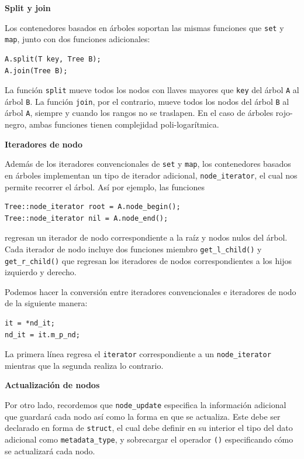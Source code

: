 \documentclass[11pt, letterpaper, twoside]{article}
\begin{document}
\textbf{Split y join}

Los contenedores basados en árboles soportan las mismas funciones que \texttt{set} y \texttt{map}, junto con dos funciones adicionales: 

\begin{lstlisting}
A.split(T key, Tree B);
A.join(Tree B);
\end{lstlisting}

La función \texttt{split} mueve todos los nodos con llaves mayores que \texttt{key} del árbol \texttt{A} al árbol \texttt{B}. La función \texttt{join}, por el contrario, mueve todos los nodos del árbol \texttt{B} al árbol \texttt{A}, siempre y cuando los rangos no se traslapen. En el caso de árboles rojo-negro, ambas funciones tienen complejidad poli-logarítmica.\medskip

\textbf{Iteradores de nodo}

Además de los iteradores convencionales de \texttt{set} y \texttt{map}, los contenedores basados en árboles implementan un tipo de iterador adicional, \texttt{node\_iterator}, el cual nos permite recorrer el árbol. Así por ejemplo, las funciones
\begin{lstlisting}
Tree::node_iterator root = A.node_begin();
Tree::node_iterator nil = A.node_end();
\end{lstlisting}
regresan un iterador de nodo correspondiente a la raíz y nodos nulos del árbol. Cada iterador de nodo incluye dos funciones miembro \texttt{get\_l\_child()} y \texttt{get\_r\_child()} que regresan los iteradores de nodos correspondientes a los hijos izquierdo y derecho.

Podemos hacer la conversión entre iteradores convencionales e iteradores de nodo de la siguiente manera:
\begin{lstlisting}
it = *nd_it;
nd_it = it.m_p_nd;
\end{lstlisting}
La primera línea regresa el \texttt{iterator} correspondiente a un \texttt{node\_iterator} mientras que la segunda realiza lo contrario.\medskip

\textbf{Actualización de nodos}

Por otro lado, recordemos que \texttt{node\_update} especifica la información adicional que guardará cada nodo así como la forma en que se actualiza. Este debe ser declarado en forma de \texttt{struct}, el cual debe definir en su interior el tipo del dato adicional como \texttt{metadata\_type}, y sobrecargar el operador \texttt{()} especificando cómo se actualizará cada nodo. 
\end{document}
